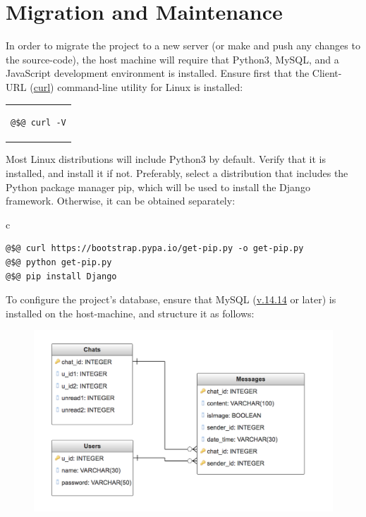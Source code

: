 \documentclass[11pt]{article}
\begin{document}
\section{Migration and Maintenance}
In order to migrate the project to a new server (or make and push any changes to the source-code),
the host machine will require that Python3, MySQL, and a JavaScript development environment is
installed. Ensure first that the Client-URL (\url{curl}) command-line utility for Linux is
installed:
\begin{center} \begin{tabular}{c} \begin{lstlisting}[linewidth=1.75cm]
@$@ curl -V
\end{lstlisting} \end{tabular} \end{center}
If not, install it using your system's appropriate package-installation tool. For Debian, Ubuntu,
or related distributions, use:
\begin{center} \begin{tabular}{c} \begin{lstlisting}[linewidth=5cm]
@$@ sudo apt-get install curl
\end{lstlisting} \end{tabular} \end{center}
Most Linux distributions will include Python3 by default. Verify that it is installed, and install
it if not. Preferably, select a distribution that includes the Python package manager pip, which
will be used to install the Django framework. Otherwise, it can be obtained separately:
\begin{center} \begin{tabular}{c} \begin{lstlisting}[linewidth=10.8cm]
@$@ curl https://bootstrap.pypa.io/get-pip.py -o get-pip.py
@$@ python get-pip.py
@$@ pip install Django
\end{lstlisting} \end{tabular} \end{center}
To configure the project's database, ensure that MySQL (\url{v.14.14} or later) is installed on the
host-machine, and structure it as follows:
\begin{figure}[H]
\includegraphics[scale=0.65]{tables.png}
\centering
\end{figure}
\end{document}
